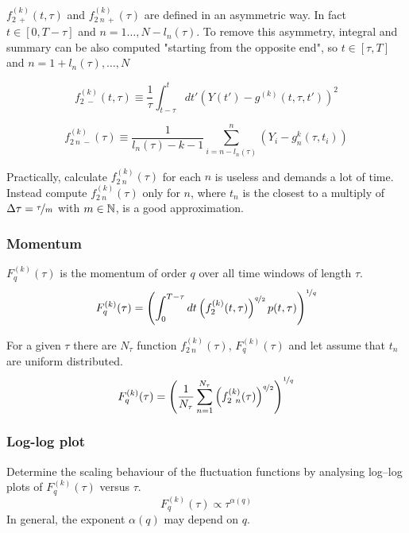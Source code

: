 $f_{2 \ +}^{( k )}( t, \tau )$ and $f_{2\ n \ +}^{( k )}( \tau )$ are defined in an asymmetric way. In fact $t \in [0, T-\tau]$ and $n = 1 \dots, N - l_n(\tau)$. 
To remove this asymmetry, integral and summary can be also computed "starting from the opposite end", so $t \in [\tau, T]$ and $n = 1 + l_n(\tau), \dots, N$

\begin{equation}
	f_{2 \ -}^{( k )}( t, \tau ) \equiv \frac{1}{\tau} \int_{t-\tau}^{t} dt' \left( Y( t' ) - g^{( k )}(t, \tau, t')  \right)^2
\end{equation}

\begin{equation}
	f_{2\ n \ -}^{( k )}( \tau ) \equiv \frac{1}{l_n(\tau) - k - 1} \sum_{i=n - l_n(\tau)}^{n} \left(Y_i - g_n^{k} (\tau, t_i) \right)
\end{equation}

Practically, calculate $f_{2\ n}^{( k )}( \tau )$ for each $n$ is useless and demands a lot of time.  Instead compute $f_{2\ n}^{( k )}( \tau )$ only for $n$, where $t_n$ is the closest to a multiply of $\Delta \tau = \nicefrac{\tau}{m}$ with $m \in \mathbb{N}$, is a good approximation. 

\subsubsection{Momentum}\label{step4}
$F_q^{( k )}(\tau )$ is the momentum of order $q$ over all time windows of length $\tau$.
\begin{equation}
	F_q^{( k )} ( \tau ) =  \left(\int_0^{T-\tau} dt \left( f_2^{( k )}( t, \tau ) \right)^{\nicefrac{q}{2}} p(t, \tau)  \right)^{\nicefrac{1}{q}}
\end{equation}

For a given $\tau$ there are $N_\tau$ function $f_{2\ n}^{( k )}( \tau )$, $F_q^{( k )} ( \tau )$ and let assume that $t_n$ are uniform distributed.
\begin{equation}
	F_q^{( k )} ( \tau ) = \left( \frac{1}{N_\tau} \sum_{n=1}^{N_\tau} \left( f_{2\ n}^{( k )}( \tau ) \right)^{\nicefrac{q}{2}} \right)^{\nicefrac{1}{q}}
\end{equation}

\subsubsection{Log-log plot}\label{step5}
Determine the scaling behaviour of the fluctuation functions by analysing
log–log plots of $F_q^{( k )}(\tau )$ versus $\tau$.
\begin{equation}
	F_q^{( k )}(\tau ) \propto \tau^{\alpha(q)}
\end{equation}
In general, the exponent $\alpha(q)$ may depend on $q$. 

